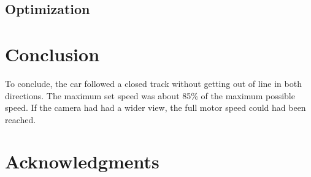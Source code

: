 \documentclass[11pt,twocolumn]{article}
\begin{document}
\subsection{Optimization}

\section{Conclusion}
To conclude, the car followed a closed track without getting out of line in both directions. The maximum set speed was about 85\% of the maximum possible speed. If the camera had had a wider view, the full motor speed could had been reached.

\section*{Acknowledgments}


\begin{small}


\end{small}
\end{document}
